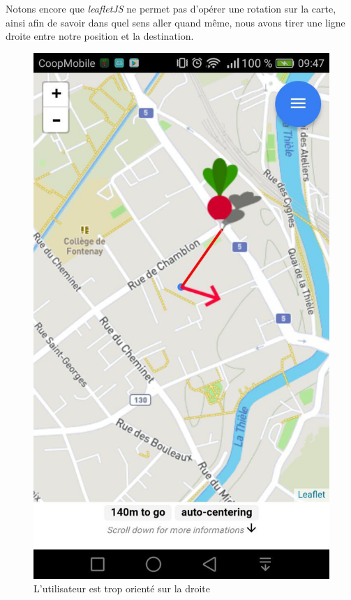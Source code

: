 \documentclass[french]{article}
\begin{document}
	Notons encore que \textit{leafletJS} ne permet pas d'opérer une rotation sur la carte, ainsi afin de savoir dans quel sens aller quand même, nous avons tirer une ligne droite entre notre position et la destination. 
	\begin{figure}[H]
		\begin{minipage}[c]{.46\linewidth}
			\centering
			\includegraphics[scale=0.40]{../images/boussole-cote}
			\caption{L'utilisateur est trop orienté sur la droite}
			\label{L'utilisateur est trop orienté sur la droite}

\end{minipage}
\end{figure}
\end{document}
